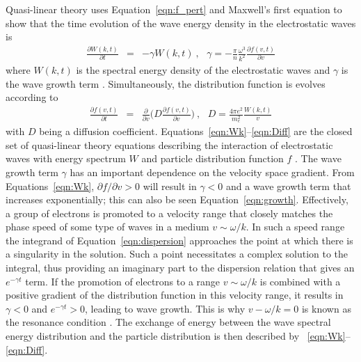 Quasi-linear theory uses Equation~\ref{eqn:f_pert} and Maxwell's first equation to show that the time evolution of the wave energy density in the electrostatic waves is
\begin{eqnarray}
\frac{\partial W(k,t)}{\partial t} &=& -\gamma W(k,t)~,~~~\gamma = -\frac{\pi}{n}\frac{\omega^3}{k^2} \frac{\partial f(v,t)}{\partial v}
\label{eqn:Wk}
\end{eqnarray}
where $W(k,t)$ is the spectral energy density of the electrostatic waves and $\gamma$ is the wave growth term \citep{vedenov1963}.
Simultaneously, the distribution function is evolves according to 
\begin{eqnarray}
\frac{\partial f(v,t)}{\partial t} &=& \frac{\partial }{\partial v} \bigg(D\frac{\partial f(v,t)}{\partial v}\bigg)~,~~~D = \frac{4\pi e^2}{m_e^2}\frac{W(k,t)}{v}
\label{eqn:Diff}
\end{eqnarray}
with $D$ being a diffusion coefficient. Equations~\ref{eqn:Wk}--\ref{eqn:Diff} are the closed set of quasi-linear theory equations describing the interaction of electrostatic waves with energy spectrum $W$ and particle distribution function $f$ \citep{vedenov1963, kontar2001}. The wave growth term $\gamma$ has an important dependence on the velocity space gradient. From Equations~\ref{eqn:Wk}, $\partial f/\partial v >0$ will result in $\gamma <0$ and a wave growth term that increases exponentially; this can also be seen Equation~\ref{eqn:growth}. Effectively, a group of electrons is promoted to a velocity range that closely matches the phase speed of some type of waves in a medium $v \sim \omega/k$. In such a speed range the integrand of Equation~\ref{eqn:dispersion} approaches the point at which there is a singularity in the solution. Such a point necessitates a complex solution to the integral, thus providing an imaginary part to the dispersion relation that gives an $e^{-\gamma t}$ term. If the promotion of electrons to a range $v \sim \omega/k$ is combined with a positive gradient of the distribution function in this velocity range, it results in $\gamma < 0$ and $e^{-\gamma t}>0$, leading to wave growth. This is why $v - \omega/k=0$ is known as the resonance condition \citep{melrose1989}. The exchange of energy between the wave spectral energy distribution and the particle distribution is then described by ~\ref{eqn:Wk}--\ref{eqn:Diff}.

